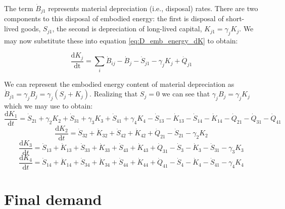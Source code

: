 The term $\dot{B}_{j1}$ represents material depreciation (i.e., disposal) rates. There are two components to this disposal of embodied energy: the first is disposal of short-lived goods, $S_{j1}$, the second is depreciation of long-lived capital, $K_{j1} = \gamma_j K_{j}$. We may now substitute these into equation \ref{eq:D_emb_energy_dK} to obtain:

\begin{equation}\label{eq:D_dep}
\frac{\textrm{d}K_{j}}{\textrm{dt}} = \sum_{i}\dot{B}_{ij} - \dot{B}_{j} - \dot{S}_{j1} - \gamma_j K_j + \dot{Q}_{j1}
\end{equation}

We can represent the embodied energy content of material depreciation as $\dot{B}_{j1} = \gamma_j B_j = \gamma_j (S_j + K_j)$. Realizing that $S_j = 0$ we can see that $\gamma_j B_j = \gamma_j K_j$ which we may use to obtain:
%
\begin{equation} \label{eq:D-embodied_acct_1_depreciation}
	\frac{\mathrm{d}K_{1}}{\mathrm{d}t} 	 = \dot{S}_{21} + \gamma_2 K_2 + \dot{S}_{31} + \gamma_3 K_3 + \dot{S}_{41} + \gamma_4 K_4 - \dot{S}_{13} - \dot{K}_{13} - \dot{S}_{14} - \dot{K}_{14} - \dot{Q}_{21} - \dot{Q}_{31} - \dot{Q}_{41}
\end{equation}
%
\begin{equation} \label{eq:D-embodied_acct_2_depreciation}
	\frac{\mathrm{d}K_{2}}{\mathrm{d}t} 	 = \dot{S}_{32} + \dot{K}_{32} + \dot{S}_{42} + \dot{K}_{42} + \dot{Q}_{21} - \dot{S}_{21} - \gamma_2 K_2
\end{equation}
%
\begin{equation} \label{eq:D-embodied_acct_3_depreciation}
	\frac{\mathrm{d}K_{3}}{\mathrm{d}t} 	 = \dot{S}_{13} + \dot{K}_{13} + \dot{S}_{33} + \dot{K}_{33} + \dot{S}_{43} + \dot{K}_{43} + \dot{Q}_{31} - \dot{S}_{3} - \dot{K}_{3} - \dot{S}_{31} - \gamma_3 K_3
\end{equation}
%
\begin{equation} \label{eq:D-embodied_acct_4_depreciation}
	\frac{\mathrm{d}K_{4}}{\mathrm{d}t}	 = \dot{S}_{14} + \dot{K}_{14} + \dot{S}_{34} + \dot{K}_{34} + \dot{S}_{44} + \dot{K}_{44} + \dot{Q}_{41} - \dot{S}_{4} - \dot{K}_{4} - \dot{S}_{41} - \gamma_4 K_4
\end{equation}


\section{Final demand}

